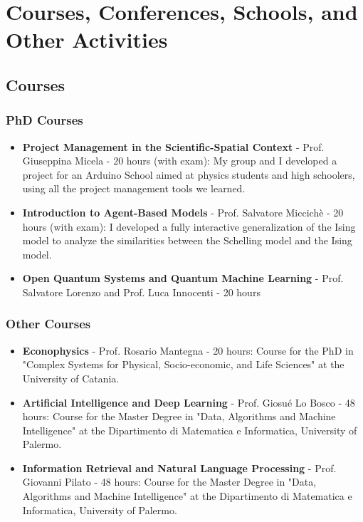 \documentclass[a4paper, 10pt]{scrartcl}
\begin{document}
\section{Courses, Conferences, Schools, and Other Activities}

\subsection*{Courses}
\subsubsection*{PhD Courses}
\begin{itemize}
  \item \textbf{Project Management in the Scientific-Spatial Context} - Prof. Giuseppina Micela - 20 hours (with exam): My group and I developed a project for an Arduino School aimed at physics students and high schoolers, using all the project management tools we learned.
  \item \textbf{Introduction to Agent-Based Models} - Prof. Salvatore Miccichè - 20 hours (with exam): I developed a fully interactive generalization of the Ising model to analyze the similarities between the Schelling model and the Ising model.
  \item \textbf{Open Quantum Systems and Quantum Machine Learning} - Prof. Salvatore Lorenzo and Prof. Luca Innocenti - 20 hours
\end{itemize}

\subsubsection*{Other Courses}
\begin{itemize}
  \item \textbf{Econophysics} - Prof. Rosario Mantegna - 20 hours: Course for the PhD in "Complex Systems for Physical, Socio-economic, and Life Sciences" at the University of Catania.
  \item \textbf{Artificial Intelligence and Deep Learning} - Prof. Giosué Lo Bosco - 48 hours: Course for the Master Degree in "Data, Algorithms and Machine Intelligence" at the Dipartimento di Matematica e Informatica, University of Palermo.
  \item \textbf{Information Retrieval and Natural Language Processing} - Prof. Giovanni Pilato - 48 hours: Course for the Master Degree in "Data, Algorithms and Machine Intelligence" at the Dipartimento di Matematica e Informatica, University of Palermo.
\end{itemize}
\end{document}
